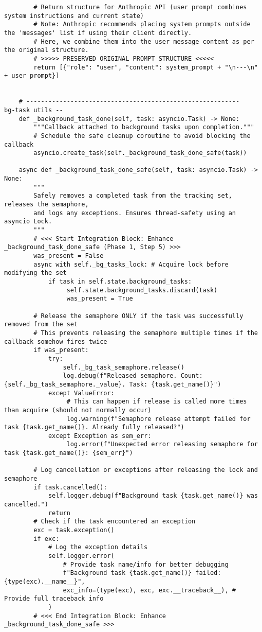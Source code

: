\documentclass[12pt,a4paper]{article}
\begin{document}
\begin{pageablecode}
\begin{verbatim}
        # Return structure for Anthropic API (user prompt combines system instructions and current state)
        # Note: Anthropic recommends placing system prompts outside the 'messages' list if using their client directly.
        # Here, we combine them into the user message content as per the original structure.
        # >>>>> PRESERVED ORIGINAL PROMPT STRUCTURE <<<<<
        return [{"role": "user", "content": system_prompt + "\n---\n" + user_prompt}]


    # ---------------------------------------------------------- bg‑task utils --
    def _background_task_done(self, task: asyncio.Task) -> None:
        """Callback attached to background tasks upon completion."""
        # Schedule the safe cleanup coroutine to avoid blocking the callback
        asyncio.create_task(self._background_task_done_safe(task))

    async def _background_task_done_safe(self, task: asyncio.Task) -> None:
        """
        Safely removes a completed task from the tracking set, releases the semaphore,
        and logs any exceptions. Ensures thread-safety using an asyncio Lock.
        """
        # <<< Start Integration Block: Enhance _background_task_done_safe (Phase 1, Step 5) >>>
        was_present = False
        async with self._bg_tasks_lock: # Acquire lock before modifying the set
            if task in self.state.background_tasks:
                 self.state.background_tasks.discard(task)
                 was_present = True

        # Release the semaphore ONLY if the task was successfully removed from the set
        # This prevents releasing the semaphore multiple times if the callback somehow fires twice
        if was_present:
            try:
                self._bg_task_semaphore.release()
                log.debug(f"Released semaphore. Count: {self._bg_task_semaphore._value}. Task: {task.get_name()}")
            except ValueError:
                 # This can happen if release is called more times than acquire (should not normally occur)
                 log.warning(f"Semaphore release attempt failed for task {task.get_name()}. Already fully released?")
            except Exception as sem_err:
                 log.error(f"Unexpected error releasing semaphore for task {task.get_name()}: {sem_err}")

        # Log cancellation or exceptions after releasing the lock and semaphore
        if task.cancelled():
            self.logger.debug(f"Background task {task.get_name()} was cancelled.")
            return
        # Check if the task encountered an exception
        exc = task.exception()
        if exc:
            # Log the exception details
            self.logger.error(
                # Provide task name/info for better debugging
                f"Background task {task.get_name()} failed: {type(exc).__name__}",
                exc_info=(type(exc), exc, exc.__traceback__), # Provide full traceback info
            )
        # <<< End Integration Block: Enhance _background_task_done_safe >>>


\end{verbatim}
\end{pageablecode}
\end{document}
